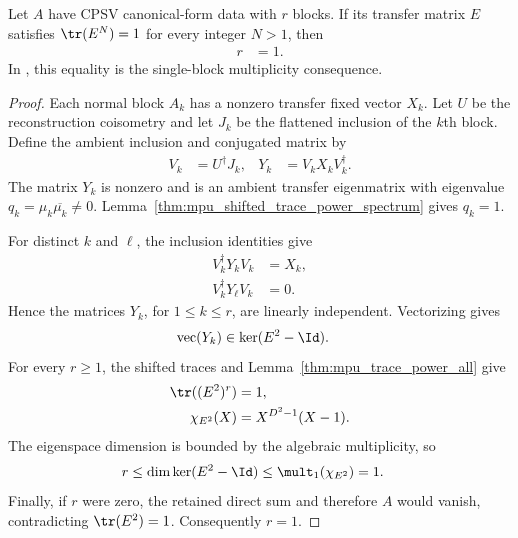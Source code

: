 \begin{lemma}
    \label{thm:mpu_shifted_transfer_trace_single_block}
    \leanok
    Let $A$ have CPSV canonical-form data with $r$ blocks.  If its
    transfer matrix $E$ satisfies
    $\tr(E^N)=1$ for every integer $N>1$, then
    \begin{align}
        r & =1.
    \end{align}
    In \cite[Proposition~III.1]{Cirac2017MPU}, this equality is the single-block multiplicity
    consequence.
\end{lemma}

\begin{proof}\leanok
    Each normal block $A_k$ has a nonzero transfer fixed vector $X_k$.
    Let $U$ be the reconstruction coisometry and let $J_k$ be the flattened
    inclusion of the $k$th block.  Define the ambient inclusion and conjugated
    matrix by
    \begin{align}
        V_k & =U^\dagger J_k,
            & Y_k             & =V_kX_kV_k^\dagger.
    \end{align}
    The matrix $Y_k$ is nonzero and is an ambient transfer eigenmatrix with
    eigenvalue $q_k=\mu_k\overline{\mu_k}\ne0$.
    Lemma~\ref{thm:mpu_shifted_trace_power_spectrum} gives $q_k=1$.

    For distinct $k$ and $\ell$, the inclusion identities give
    \begin{align}
        V_k^\dagger Y_kV_k     & =X_k, \\
        V_k^\dagger Y_\ell V_k & =0.
    \end{align}
    Hence the matrices $Y_k$, for $1\le k\le r$, are linearly independent.
    Vectorizing gives
    \begin{align}
        \operatorname{vec}(Y_k) & \in\ker(E^2-\Id).
    \end{align}
    For every $r\ge1$, the shifted traces and
    Lemma~\ref{thm:mpu_trace_power_all} give
    \begin{align}
        \tr((E^2)^r)  & =1,              \\
        \chi_{E^2}(X) & =X^{D^2-1}(X-1).
    \end{align}
    The eigenspace dimension is bounded by the algebraic multiplicity, so
    \begin{align}
        r
         & \le \dim\ker(E^2-\Id)
        \le \mult_{1}(\chi_{E^2})
        =1.
    \end{align}
    Finally, if $r$ were zero, the retained direct sum and therefore $A$ would
    vanish, contradicting $\tr(E^2)=1$.  Consequently $r=1$.
\end{proof}


